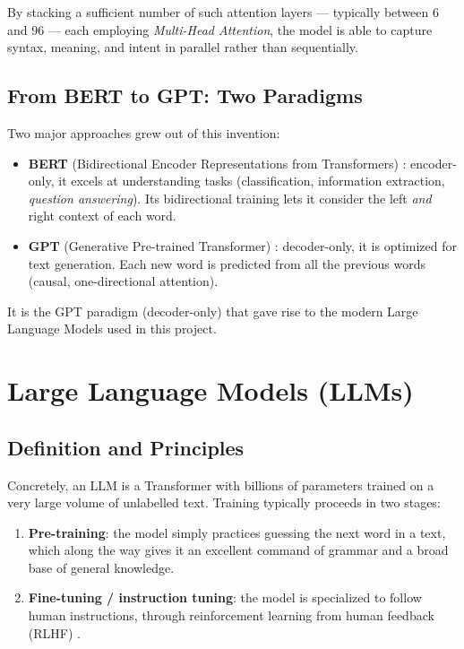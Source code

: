 \documentclass[12pt, a4paper]{report}
\newcommand{\sourced}[1]{#1}        %
\newcommand{\humantext}[1]{#1}      %
\begin{document}
\humantext{By stacking a sufficient number of such attention layers --- typically between 6 and 96 --- each employing \textit{Multi-Head Attention}, the model is able to capture syntax, meaning, and intent in parallel rather than sequentially.}

\subsection{From BERT to GPT: Two Paradigms}
\humantext{Two major approaches grew out of this invention:}
\begin{itemize}
    \item \sourced{\textbf{BERT} (Bidirectional Encoder Representations from Transformers) \cite{devlin2019bert}: encoder-only, it excels at understanding tasks (classification, information extraction, \textit{question answering}). Its bidirectional training lets it consider the left \textit{and} right context of each word.}
    \item \sourced{\textbf{GPT} (Generative Pre-trained Transformer) \cite{brown2020gpt3}: decoder-only, it is optimized for text generation. Each new word is predicted from all the previous words (causal, one-directional attention).}
\end{itemize}

\humantext{It is the GPT paradigm (decoder-only) that gave rise to the modern Large Language Models used in this project.}

\section{Large Language Models (LLMs)}

\subsection{Definition and Principles}
\humantext{Concretely, an LLM is a Transformer with billions of parameters trained on a very large volume of unlabelled text. Training typically proceeds in two stages:}
\begin{enumerate}[noitemsep]
    \item \humantext{\textbf{Pre-training}: the model simply practices guessing the next word in a text, which along the way gives it an excellent command of grammar and a broad base of general knowledge.}
    \item \sourced{\textbf{Fine-tuning / instruction tuning}: the model is specialized to follow human instructions, through reinforcement learning from human feedback (RLHF) \cite{ouyang2022rlhf}.}
\end{enumerate}
\end{document}
